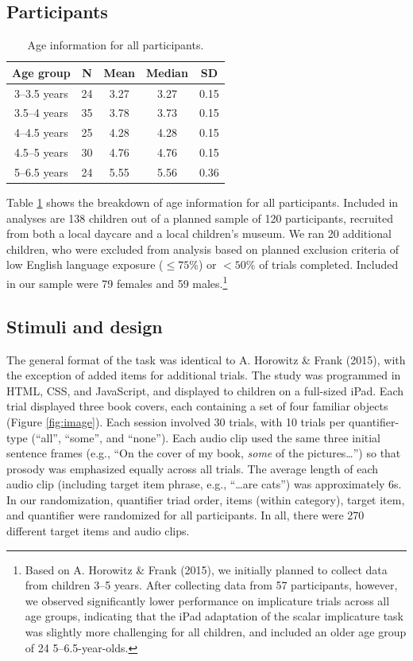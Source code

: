 \documentclass[10pt, letterpaper]{article}
\begin{document}
\subsection{Participants}\label{participants}

\begin{table}[t]
\centering
\begin{tabular}{c c c c c } 
 \hline
 Age group & N & Mean & Median & SD \\
 \hline
 3--3.5 years & 24 & 3.27 & 3.27 & 0.15\\
 3.5--4 years & 35 & 3.78 & 3.73 & 0.15 \\ 
 4--4.5 years & 25 & 4.28 & 4.28 & 0.15\\
 4.5--5 years & 30 & 4.76 & 4.76 & 0.15 \\
 5--6.5 years & 24 & 5.55 & 5.56 & 0.36 \\
 \hline
\end{tabular}
\caption{Age information for all participants.}
\label{tab:age}
\end{table}

Table \ref{tab:age} shows the breakdown of age information for all
participants. Included in analyses are 138 children out of a planned
sample of 120 participants, recruited from both a local daycare and a
local children's museum. We ran 20 additional children, who were
excluded from analysis based on planned exclusion criteria of low
English language exposure (\(\leq 75\%\)) or \(<50\%\) of trials
completed. Included in our sample were 79 females and 59
males.\footnote{Based on A. Horowitz \& Frank (2015), we initially
  planned to collect data from children 3--5 years. After collecting
  data from 57 participants, however, we observed significantly lower
  performance on implicature trials across all age groups, indicating
  that the iPad adaptation of the scalar implicature task was slightly
  more challenging for all children, and included an older age group of
  24 5--6.5-year-olds.}

\subsection{Stimuli and design}\label{stimuli-and-design}

The general format of the task was identical to A. Horowitz \& Frank
(2015), with the exception of added items for additional trials. The
study was programmed in HTML, CSS, and JavaScript, and displayed to
children on a full-sized iPad. Each trial displayed three book covers,
each containing a set of four familiar objects (Figure \ref{fig:image}).
Each session involved 30 trials, with 10 trials per quantifier-type
(``all'', ``some'', and ``none''). Each audio clip used the same three
initial sentence frames (e.g., ``On the cover of my book, \emph{some} of
the pictures\ldots{}'') so that prosody was emphasized equally across
all trials. The average length of each audio clip (including target item
phrase, e.g., ``\ldots{}are cats'') was approximately 6s. In our
randomization, quantifier triad order, items (within category), target
item, and quantifier were randomized for all participants. In all, there
were 270 different target items and audio clips.
\end{document}
